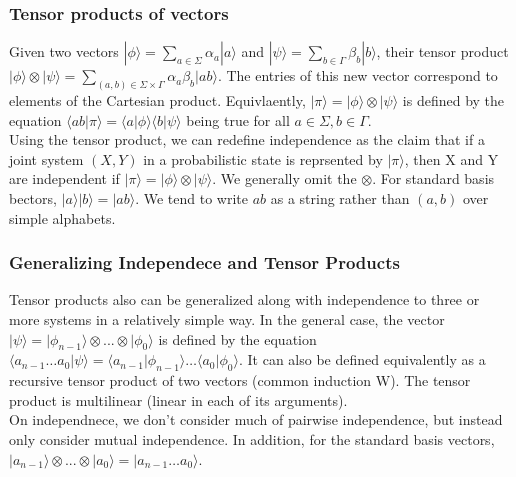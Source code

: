 \documentclass{amsart}
\begin{document}
\subsubsection*{Tensor products of vectors}
Given two vectors $ |\phi \rangle = \sum_{a \in \Sigma} \alpha_a |a\rangle $ and
$ |\psi\rangle = \sum_{b \in \Gamma} \beta_b |b\rangle $, their tensor product
$ |\phi \rangle \otimes |\psi \rangle = \sum_{(a,b) \in \Sigma \times \Gamma}\alpha_a\beta_b
|ab\rangle $. The entries of this new vector correspond to elements of the Cartesian product.
Equivlaently, $ |\pi\rangle = |\phi\rangle \otimes |\psi\rangle $ is defined by the equation
$ \langle ab|\pi \rangle = \langle a|\phi \rangle \langle b|\psi \rangle $ being true for all
$ a \in \Sigma, b \in \Gamma $. \\
Using the tensor product, we can redefine independence as the claim that if a joint system
$ (X,Y) $ in a probabilistic state is reprsented by $ |\pi \rangle $, then X and Y are
independent if $ |\pi \rangle = |\phi \rangle \otimes |\psi \rangle $. We generally omit the
$ \otimes $. For standard basis bectors, $ |a \rangle |b\rangle = |ab\rangle $. We tend to
write $ ab $ as a string rather than $ (a,b) $ over simple alphabets. \\
\subsubsection*{Generalizing Independece and Tensor Products}
Tensor products also can be generalized along with independence to three
or more systems in a relatively simple way. In the general case, the vector
$ |\psi\rangle = |\phi_{n-1}\rangle \otimes ... \otimes |\phi_0\rangle $ is defined by the
equation $ \langle a_{n-1} \dots a_0 |\psi\rangle = \langle a_{n-1}|\phi_{n-1}\rangle \dots
\langle a_0 | \phi_0 \rangle $. It can also be defined equivalently as a recursive tensor
product of two vectors (common induction W). The tensor product is multilinear (linear in each
of its arguments). \\
On independnece, we don't consider much of pairwise independence, but instead only consider
mutual independence. In addition, for the standard basis vectors,
$ |a_{n-1}\rangle \otimes ... \otimes |a_0 \rangle = |a_{n-1} \dots a_0\rangle $.
\end{document}
